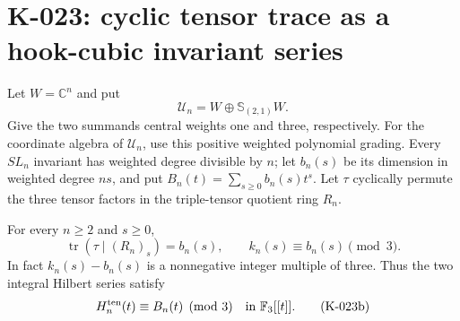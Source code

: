 \section{K-023: cyclic tensor trace as a hook-cubic invariant series}

Let $W=\mathbb C^n$ and put
\[
 \mathcal U_n=W\oplus\mathbb S_{(2,1)}W.
\]
Give the two summands central weights one and three, respectively.
For the coordinate algebra of $\mathcal U_n$, use this positive
weighted polynomial grading.  Every $SL_n$ invariant has weighted
degree divisible by $n$; let $b_n(s)$ be its dimension in weighted
degree $ns$, and put $B_n(t)=\sum_{s\ge0}b_n(s)t^s$.
Let $\tau$ cyclically permute the three tensor factors in the
triple-tensor quotient ring $R_n$.

\begin{theorem}[K-023]
For every $n\ge2$ and $s\ge0$,
\[
 \operatorname{tr}(\tau\mid (R_n)_s)=b_n(s),\qquad
                         k_n(s)\equiv b_n(s)\pmod3.
                                                               \tag{K-023a}
\]
In fact $k_n(s)-b_n(s)$ is a nonnegative integer multiple of three.
Thus the two integral Hilbert series satisfy
\[
                         H_n^{\rm ten}(t)\equiv B_n(t)\pmod3
                           \quad\hbox{in }\mathbb F_3[[t]].
                                                               \tag{K-023b}
\]
\end{theorem}

